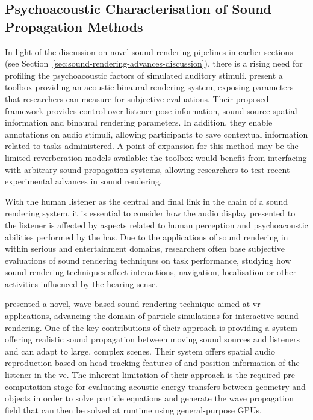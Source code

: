 \subsection{Psychoacoustic Characterisation of Sound Propagation Methods}
In light of the discussion on novel sound rendering pipelines in earlier sections (see Section~\ref{sec:sound-rendering-advances-discussion}), there is a rising need for profiling the psychoacoustic factors of simulated auditory stimuli. \cite{gonzalez2023binaural} present a toolbox providing an acoustic binaural rendering system, exposing parameters that researchers can measure for subjective evaluations. Their proposed framework provides control over listener pose information, sound source spatial information and binaural rendering parameters. In addition, they enable annotations on audio stimuli, allowing participants to save contextual information related to tasks administered. A point of expansion for this method may be the limited reverberation models available: the toolbox would benefit from interfacing with arbitrary sound propagation systems, allowing researchers to test recent experimental advances in sound rendering.\par
With the human listener as the central and final link in the chain of a sound rendering system, it is essential to consider how the audio display presented to the listener is affected by aspects related to human perception and psychoacoustic abilities performed by the \acrshort{has}. Due to the applications of sound rendering in  within serious and entertainment domains, researchers often base subjective evaluations of sound rendering techniques on task performance, studying how sound rendering techniques affect interactions, navigation, localisation or other activities influenced by the hearing sense.\par
\cite{mehra2015wave} presented a novel, wave-based sound rendering technique aimed at \acrshort{vr} applications, advancing the domain of particle simulations for interactive sound rendering. One of the key contributions of their approach is providing a system offering realistic sound propagation between moving sound sources and listeners and can adapt to large, complex scenes. Their system offers spatial audio reproduction based on head tracking features of  and position information of the listener in the \acrshort{ve}. The inherent limitation of their approach is the required pre-computation stage for evaluating acoustic energy transfers between geometry and objects in order to solve particle equations and generate the wave propagation field that can then be solved at runtime using general-purpose GPUs.\par
